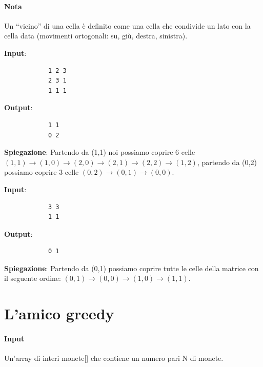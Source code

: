     \paragraph{Nota} Un ``vicino'' di una cella è definito come una cella che condivide un lato con la cella data (movimenti ortogonali: su, giù, destra, sinistra).
    \begin{esempio}
        \newline
        \textbf{Input}:
        \begin{verbatim}
            1 2 3
            2 3 1
            1 1 1
        \end{verbatim}
        \textbf{Output}: 
        \begin{verbatim}
            1 1
            0 2
        \end{verbatim}
        \textbf{Spiegazione}: Partendo da (1,1) noi possiamo coprire 6 celle $(1,1)\rightarrow(1,0)\rightarrow(2,0)\rightarrow(2,1)\rightarrow(2,2)\rightarrow(1,2)$, partendo da (0,2) possiamo coprire 3 celle $(0,2)\rightarrow(0,1)\rightarrow(0,0)$.
    \end{esempio}
    \begin{esempio}
        \newline
        \textbf{Input}: 
        \begin{verbatim}
            3 3
            1 1
        \end{verbatim}
        \textbf{Output}: 
        \begin{verbatim}
            0 1
        \end{verbatim}
        \textbf{Spiegazione}: Partendo da (0,1) possiamo coprire tutte le celle della matrice con il seguente ordine: $(0,1)\rightarrow(0,0)\rightarrow(1,0)\rightarrow(1,1)$.
    \end{esempio}

\newpage
\thispagestyle{chapterInit}
\section*{L'amico greedy}
    \paragraph{Input} Un'array di interi monete[] che contiene un numero pari N di monete.
